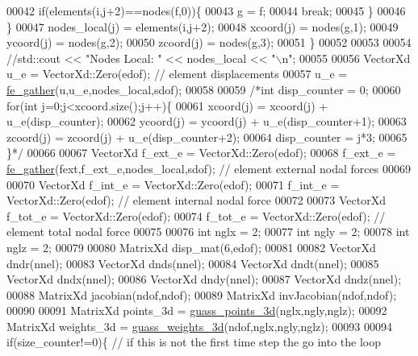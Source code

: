 \begin{DoxyCode}
00042                 \textcolor{keywordflow}{if}(elements(i,j+2)==nodes(f,0))\{
00043                     g = f;
00044                     \textcolor{keywordflow}{break};
00045                 \}
00046             \}
00047             nodes\_local(j) = elements(i,j+2);
00048             xcoord(j) = nodes(g,1);
00049             ycoord(j) = nodes(g,2);
00050             zcoord(j) = nodes(g,3);
00051         \}
00052 
00053 
00054     \textcolor{comment}{//std::cout << "Nodes Local: " << nodes\_local << "\(\backslash\)n";}
00055 
00056     VectorXd u\_e = VectorXd::Zero(edof); \textcolor{comment}{// element displacements}
00057     u\_e = \hyperlink{functions_8h_ab5053cb12ac67971a7836346e2839725}{fe\_gather}(u,u\_e,nodes\_local,sdof);
00058 
00059     \textcolor{comment}{/*int disp\_counter = 0;}
00060 \textcolor{comment}{    for(int j=0;j<xcoord.size();j++)\{}
00061 \textcolor{comment}{        xcoord(j) = xcoord(j) + u\_e(disp\_counter);}
00062 \textcolor{comment}{        ycoord(j) = ycoord(j) + u\_e(disp\_counter+1);}
00063 \textcolor{comment}{        zcoord(j) = zcoord(j) + u\_e(disp\_counter+2);}
00064 \textcolor{comment}{        disp\_counter = j*3;}
00065 \textcolor{comment}{    \}*/}
00066 
00067     VectorXd f\_ext\_e = VectorXd::Zero(edof);
00068     f\_ext\_e = \hyperlink{functions_8h_ab5053cb12ac67971a7836346e2839725}{fe\_gather}(fext,f\_ext\_e,nodes\_local,sdof); \textcolor{comment}{// element external nodal forces}
00069 
00070     VectorXd f\_int\_e = VectorXd::Zero(edof);
00071     f\_int\_e = VectorXd::Zero(edof); \textcolor{comment}{// element internal nodal force}
00072 
00073     VectorXd f\_tot\_e = VectorXd::Zero(edof);
00074     f\_tot\_e = VectorXd::Zero(edof); \textcolor{comment}{// element total nodal force}
00075 
00076     \textcolor{keywordtype}{int} nglx = 2;
00077     \textcolor{keywordtype}{int} ngly = 2;
00078     \textcolor{keywordtype}{int} nglz = 2;
00079 
00080     MatrixXd disp\_mat(6,edof);
00081 
00082     VectorXd dndr(nnel);
00083     VectorXd dnds(nnel);
00084     VectorXd dndt(nnel);
00085     VectorXd dndx(nnel);
00086     VectorXd dndy(nnel);
00087     VectorXd dndz(nnel);
00088     MatrixXd jacobian(ndof,ndof);
00089     MatrixXd invJacobian(ndof,ndof);
00090 
00091     MatrixXd points\_3d = \hyperlink{functions_8h_a502e3469e1cc253deb142f46c0789a78}{guass\_points\_3d}(nglx,ngly,nglz);
00092     MatrixXd weights\_3d = \hyperlink{functions_8h_ad99b08ce65ae353e91486d7685c22024}{guass\_weights\_3d}(ndof,nglx,ngly,nglz);
00093 
00094     \textcolor{keywordflow}{if}(size\_counter!=0)\{ \textcolor{comment}{// if this is not the first time step the go into the loop}

\end{DoxyCode}
